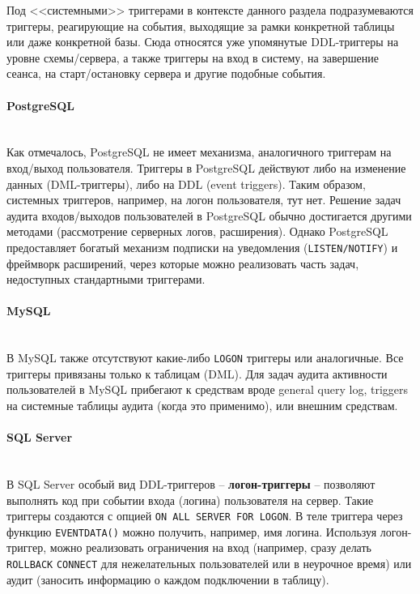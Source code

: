  Под <<системными>> триггерами в контексте данного раздела подразумеваются триггеры, реагирующие на события, выходящие за рамки конкретной таблицы или даже конкретной базы. Сюда относятся уже упомянутые DDL-триггеры на уровне схемы/сервера, а также триггеры на вход в систему, на завершение сеанса, на старт/остановку сервера и другие подобные события.

\paragraph{\textbf{PostgreSQL}} ~\\

 Как отмечалось, PostgreSQL не имеет механизма, аналогичного триггерам на вход/выход пользователя. Триггеры в PostgreSQL действуют либо на изменение данных (DML-триггеры), либо на DDL (event triggers). Таким образом, системных триггеров, например, на логон пользователя, тут нет. Решение задач аудита входов/выходов пользователей в PostgreSQL обычно достигается другими методами (рассмотрение серверных логов, расширения). Однако PostgreSQL предоставляет богатый механизм подписки на уведомления (\texttt{LISTEN/NOTIFY}) и фреймворк расширений, через которые можно реализовать часть задач, недоступных стандартными триггерами.

\paragraph{\textbf{MySQL}} ~\\

 В MySQL также отсутствуют какие-либо \texttt{LOGON} триггеры или аналогичные. Все триггеры привязаны только к таблицам (DML). Для задач аудита активности пользователей в MySQL прибегают к средствам вроде general query log, triggers на системные таблицы аудита (когда это применимо), или внешним средствам.

\paragraph{\textbf{SQL Server}} ~\\ 

 В SQL Server особый вид DDL-триггеров – \textbf{логон-триггеры} – позволяют выполнять код при событии входа (логина) пользователя на сервер. Такие триггеры создаются с опцией \texttt{ON ALL SERVER FOR LOGON}. В теле триггера через функцию \texttt{EVENTDATA()} можно получить, например, имя логина. Используя логон-триггер, можно реализовать ограничения на вход (например, сразу делать \texttt{ROLLBACK} \texttt{CONNECT} для нежелательных пользователей или в неурочное время) или аудит (заносить информацию о каждом подключении в таблицу). 
 
